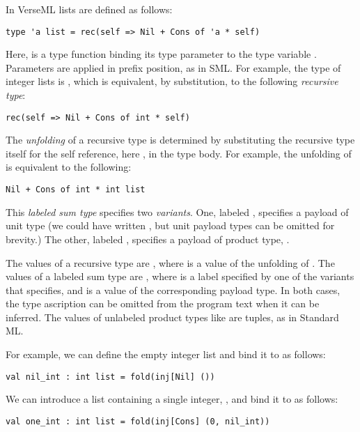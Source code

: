 In VerseML lists are defined as follows:
\begin{lstlisting}[numbers=none]
type 'a list = rec(self => Nil + Cons of 'a * self)
\end{lstlisting}
Here,  is a {type function} binding its type parameter to the type variable . Parameters are applied in prefix position, as in SML. For example, the type of integer lists is , which is equivalent, by substitution, to the following \emph{recursive type}:
\begin{lstlisting}[numbers=none]
rec(self => Nil + Cons of int * self)
\end{lstlisting}
The \emph{unfolding} of a recursive type is determined by substituting the recursive type itself for the self reference, here , in the type body. For example, the unfolding of  is equivalent to the following:
\begin{lstlisting}[numbers=none]
Nil + Cons of int * int list
\end{lstlisting}
This \emph{labeled sum type} specifies two \emph{variants}. One, labeled , specifies a payload of unit type (we could have written , but unit payload types can be omitted for brevity.) The other, labeled , specifies a payload of product type, .

The values of a recursive type  are , where  is a value of the unfolding of . The values of a labeled sum type  are , where  is a label specified by one of the variants that  specifies, and  is a value of the corresponding payload type. In both cases, the type ascription can be omitted from the program text when it can be inferred. The values of unlabeled product types like  are tuples, as in Standard ML. 

For example, we can define the empty integer list and bind it to  as follows:
\begin{lstlisting}[numbers=none]
val nil_int : int list = fold(inj[Nil] ())
\end{lstlisting}
We can introduce a list containing a single integer, , and bind it to  as follows:
\begin{lstlisting}[numbers=none]
val one_int : int list = fold(inj[Cons] (0, nil_int))
\end{lstlisting}

